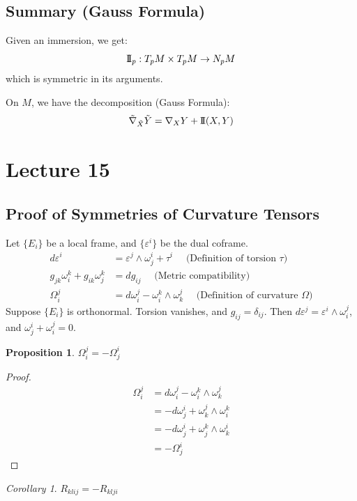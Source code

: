 \documentclass[11pt, a4paper]{article}
\theoremstyle{plain}
\newtheorem{proposition}[theorem]{Proposition}
\theoremstyle{definition}
\theoremstyle{remark}
\begin{document}
{\subsection*{Summary (Gauss Formula)}

Given an immersion, we get:
\[
\mathrm{I\!I}_p : T_p M \times T_p M \to N_p M
\]
which is symmetric in its arguments.

On $M$, we have the decomposition (Gauss Formula):
\[
\tilde{\nabla}_{\tilde{X}} \tilde{Y} = \nabla_X Y + \mathrm{I\!I}(X, Y)
\]
}

\newpage
{
    \newtheorem{cor}{Corollary}
\section{Lecture 15}

\subsection{Proof of Symmetries of Curvature Tensors}

Let $\{E_i\}$ be a local frame, and $\{\varepsilon^i\}$ be the dual coframe.
\begin{align*}
d\varepsilon^i &= \varepsilon^j \wedge \omega_j^i + \tau^i \quad \text{ (Definition of torsion } \tau \text{)} \\
g_{jk}\omega_i^k + g_{ik}\omega_j^k &= dg_{ij} \quad \text{ (Metric compatibility)} \\
\Omega_i^j &= d\omega_i^j - \omega_i^k \wedge \omega_k^j \quad \text{ (Definition of curvature } \Omega \text{)}
\end{align*}
Suppose $\{E_i\}$ is orthonormal. Torsion vanishes, and $g_{ij} = \delta_{ij}$. Then $d\varepsilon^j = \varepsilon^i \wedge \omega_i^j$, and $\omega_j^i + \omega_i^j = 0$.

\begin{proposition}
$\Omega_i^j = -\Omega_j^i$
\end{proposition}
\begin{proof}
\begin{align*}
\Omega_i^j &= d\omega_i^j - \omega_i^k \wedge \omega_k^j \\
&= -d\omega_j^i + \omega_k^j \wedge \omega_i^k \\
&= -d\omega_j^i + \omega_j^k \wedge \omega_k^i \\
&= -\Omega_j^i
\end{align*}
\end{proof}

\begin{cor}
$R_{klij} = -R_{klji}$
\end{cor}

}
\end{document}
